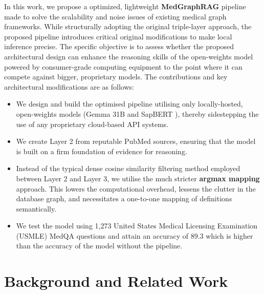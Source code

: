 \documentclass[a4paper,fleqn]{cas-sc}
\begin{document}
In this work, we propose a optimized, lightweight \textbf{MedGraphRAG} pipeline made to solve the scalability and noise issues of existing medical graph frameworks. While structurally adopting the original triple-layer approach, the proposed pipeline introduces critical original modifications to make local inference precise. The specific objective is to assess whether the proposed architectural design can enhance the reasoning skills of the open-weights model powered by consumer-grade computing equipment to the point where it can compete against bigger, proprietary models.
The contributions and key architectural modifications are as follows:
\begin{itemize}
    \item We design and build the optimised pipeline utilising only locally-hosted, open-weights models (Gemma 31B \cite{gemma2024} and SapBERT \cite{liu2021sapbert}), thereby sidestepping the use of any proprietary cloud-based API systems.
    \item We create Layer 2 from reputable PubMed sources, ensuring that the model is built on a firm foundation of evidence for reasoning.
    \item Instead of the typical dense cosine similarity filtering method employed between Layer 2 and Layer 3, we utilise the much stricter \textbf{argmax mapping} approach. This lowers the computational overhead, lessens the clutter in the database graph, and necessitates a one-to-one mapping of definitions semantically.
    \item We test the model using 1{,}273 United States Medical Licensing Examination (USMLE) MedQA questions \cite{jin2021medqa} and attain an accuracy of 89.3 which is higher than the accuracy of the model without the pipeline.
\end{itemize}

\section{Background and Related Work}
\end{document}
